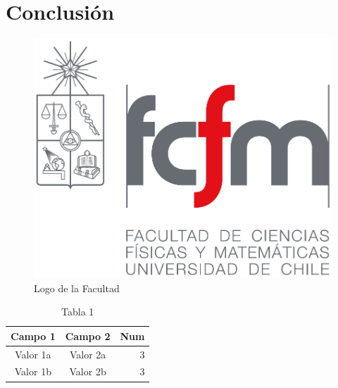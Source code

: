 \chapter{Conclusión}

\lipsum[130-132]
\begin{figure}
    \centering
    \includegraphics[scale=.2]{img/logos/fcfm.pdf}
    \caption{Logo de la Facultad}
    \label{logofcfm}
\end{figure}

\lipsum[133-134]

\begin{table}
    \centering
    \caption{Tabla 1}
    \label{tabla:1}
    \begin{tabular}{|c|c|r|}
        \hline
        \textbf{Campo 1} & \textbf{Campo 2} & \textbf{Num} \\\hline
        Valor 1a         & Valor 2a         & 3            \\
        Valor 1b         & Valor 2b         & 3            \\
        \hline
    \end{tabular}

\end{table}

\lipsum[135]
